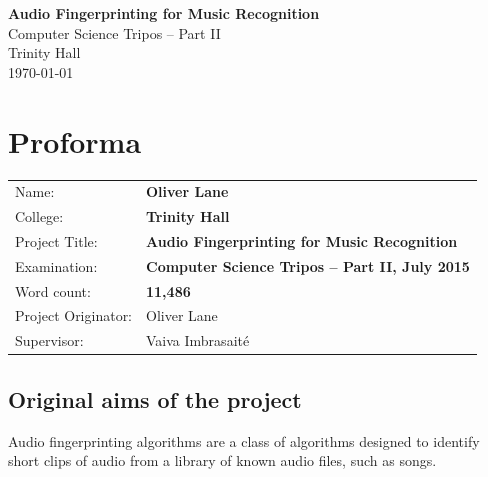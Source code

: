 \documentclass[12pt,a4paper,twoside,openright]{report}
\begin{document}





\begin{titlepage}


\vspace*{60mm}
\begin{center}
\Huge
\textbf{Audio Fingerprinting for Music Recognition} \\[5mm]
Computer Science Tripos -- Part II \\[5mm]
Trinity Hall \\[5mm]
\today  %
\end{center}


\end{titlepage}



\pagestyle{plain}
\cleardoublepage
{}

\chapter*{Proforma}

{\large
\begin{tabular}{ll}
Name:               & \bf Oliver Lane                       \\
College:            & \bf Trinity Hall                     \\
Project Title:      & \bf Audio Fingerprinting for Music Recognition \\
Examination:        & \bf Computer Science Tripos -- Part II, July 2015  \\
Word count:         & \bf 11,486  \\
Project Originator: & Oliver Lane                    \\
Supervisor:         & Vaiva Imbrasait\'{e}                    \\ 
\end{tabular}
}

\section*{Original aims of the project}

Audio fingerprinting algorithms are a class of algorithms designed to identify short clips of audio from a library of known audio files, such as songs.
\end{document}
